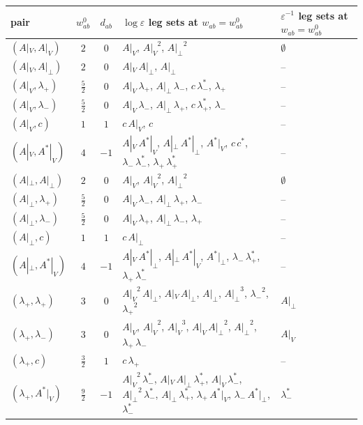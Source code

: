 \documentclass[11pt]{article}
\numberwithin{equation}{section}
\theoremstyle{plain}
\theoremstyle{definition}
\begin{document}
\begin{table}[h]
\centering\scriptsize
\begin{tabular}{l|c|c|l|l}
pair & $w^0_{ab}$ & $d_{ab}$ & $\log\varepsilon$ leg sets at $w_{ab}=w^0_{ab}$ & $\varepsilon^{-1}$ leg sets at $w_{ab}=w^0_{ab}$\\\hline
$(A|_V,A|_V)$ & $2$ & $0$ & $A|_V$, ${A|_V}^{2}$, ${A|_\perp}^{2}$ & $\emptyset$\\
$(A|_V,A|_\perp)$ & $2$ & $0$ & $A|_V\,A|_\perp$, $A|_\perp$ & --\\
$(A|_V,\lambda_+)$ & $\tfrac{5}{2}$ & $0$ & $A|_V\,\lambda_+$, $A|_\perp\,\lambda_-$, $c\,\lambda^*_-$, $\lambda_+$ & --\\
$(A|_V,\lambda_-)$ & $\tfrac{5}{2}$ & $0$ & $A|_V\,\lambda_-$, $A|_\perp\,\lambda_+$, $c\,\lambda^*_+$, $\lambda_-$ & --\\
$(A|_V,c)$ & $1$ & $1$ & $c\,A|_V$, $c$ & --\\
$(A|_V,A^*|_V)$ & $4$ & $-1$ & $A|_V\,A^*|_V$, $A|_\perp\,A^*|_\perp$, $A^*|_V$, $c\,c^*$, $\lambda_-\,\lambda^*_-$, $\lambda_+\,\lambda^*_+$ & --\\
$(A|_\perp,A|_\perp)$ & $2$ & $0$ & $A|_V$, ${A|_V}^{2}$, ${A|_\perp}^{2}$ & $\emptyset$\\
$(A|_\perp,\lambda_+)$ & $\tfrac{5}{2}$ & $0$ & $A|_V\,\lambda_-$, $A|_\perp\,\lambda_+$, $\lambda_-$ & --\\
$(A|_\perp,\lambda_-)$ & $\tfrac{5}{2}$ & $0$ & $A|_V\,\lambda_+$, $A|_\perp\,\lambda_-$, $\lambda_+$ & --\\
$(A|_\perp,c)$ & $1$ & $1$ & $c\,A|_\perp$ & --\\
$(A|_\perp,A^*|_V)$ & $4$ & $-1$ & $A|_V\,A^*|_\perp$, $A|_\perp\,A^*|_V$, $A^*|_\perp$, $\lambda_-\,\lambda^*_+$, $\lambda_+\,\lambda^*_-$ & --\\
$(\lambda_+,\lambda_+)$ & $3$ & $0$ & ${A|_V}^{2}\,A|_\perp$, $A|_V\,A|_\perp$, $A|_\perp$, ${A|_\perp}^{3}$, ${\lambda_-}^{2}$, ${\lambda_+}^{2}$ & $A|_\perp$\\
$(\lambda_+,\lambda_-)$ & $3$ & $0$ & $A|_V$, ${A|_V}^{2}$, ${A|_V}^{3}$, $A|_V\,{A|_\perp}^{2}$, ${A|_\perp}^{2}$, $\lambda_+\,\lambda_-$ & $A|_V$\\
$(\lambda_+,c)$ & $\tfrac{3}{2}$ & $1$ & $c\,\lambda_+$ & --\\
$(\lambda_+,A^*|_V)$ & $\tfrac{9}{2}$ & $-1$ & ${A|_V}^{2}\,\lambda^*_-$, $A|_V\,A|_\perp\,\lambda^*_+$, $A|_V\,\lambda^*_-$, ${A|_\perp}^{2}\,\lambda^*_-$, $A|_\perp\,\lambda^*_+$, $\lambda_+\,A^*|_V$, $\lambda_-\,A^*|_\perp$, $\lambda^*_-$ & $\lambda^*_-$\\

\end{tabular}
\end{table}
\end{document}
